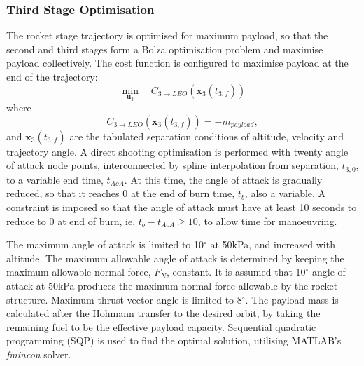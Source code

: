 \documentclass[]{aiaa-tc}
\begin{document}
	 
	 
	  \subsubsection{Third Stage Optimisation} \label{section:thirdstage}
	  
	  
	  The rocket stage trajectory is optimised for maximum payload, so that the second and third stages form a Bolza optimisation problem and maximise payload collectively. The cost function is configured to maximise payload at the end of the trajectory:
	  \begin{equation} 
	  \min\limits_{\textbf{u}_3} \quad C_{3\rightarrow LEO}(\textbf{x}_{3}(t_{3,f})) 
	  \end{equation}
	  where
	  \begin{equation}
	  C_{3\rightarrow LEO}(\textbf{x}_{3}(t_{3,f})) = -m_{payload},
	  \end{equation}
	  and $\textbf{x}_{3}(t_{3,f})$ are the tabulated separation conditions of altitude, velocity and trajectory angle. A direct shooting optimisation is performed with twenty angle of attack node points, interconnected by spline interpolation from separation, $t_{3,0}$, to a variable end time, $t_{AoA}$. At this time, the angle of attack is gradually reduced, so that it reaches 0 at the end of burn time, $t_b$, also a variable.  A constraint is imposed so that the angle of attack must have at least 10 seconds to reduce to 0 at end of burn, ie. $t_b - t_{AoA} \ge 10$, to allow time for manoeuvring.
	 
	 The maximum angle of attack is limited to 10$^\circ$ at 50kPa, and increased with altitude. The maximum allowable angle of attack is determined by keeping the maximum allowable normal force, $F_N$, constant. It is assumed that 10$^\circ$ angle of attack at 50kPa produces the maximum normal force allowable by the rocket structure. Maximum thrust vector angle is limited to 8$^\circ$. 
	  The payload mass is calculated after the Hohmann transfer to the desired orbit, by taking the remaining fuel to be the effective payload capacity. Sequential quadratic programming (SQP) is used to find the optimal solution, utilising MATLAB's \textit{fmincon} solver.
	  
\end{document}
